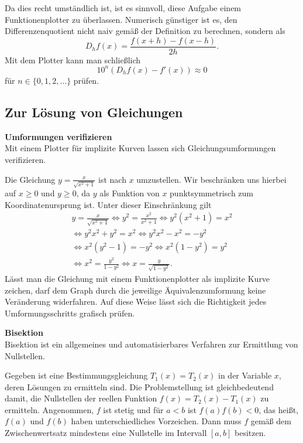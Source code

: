 \documentclass[paper=180mm:225mm,pagesize=auto,fleqn,twoside,11pt,dvipdfmx]{scrartcl}
\theoremstyle{rmbox}
\newenvironment{Rezept}[1]{\strong{#1}\\}{}
\newcommand{\strong}[1]{\textsf{\textbf{#1}}}
\begin{document}
Da dies recht umständlich ist, ist es sinnvoll, diese Aufgabe einem
Funktionenplotter zu überlassen. Numerisch günstiger ist es, den
Differenzenquotient nicht naiv gemäß der Definition zu berechnen,
sondern als%
\[D_h f(x) = \frac{f(x+h)-f(x-h)}{2h}.\]
Mit dem Plotter kann man schließlich
\[10^n (D_h f(x) - f'(x)) \approx 0\]
für $n\in\{0,1,2,\ldots\}$ prüfen.

\subsection{Zur Lösung von Gleichungen}

\begin{Rezept}{Umformungen verifizieren}
Mit einem Plotter für implizite Kurven lassen sich
Gleichungsumformungen verifizieren.
\end{Rezept}

\noindent
Die Gleichung $y = \tfrac{x}{\sqrt{x^2+1}}$ ist nach $x$ umzustellen.
Wir beschränken uns hierbei auf $x\ge 0$ und $y\ge 0$, da $y$
als Funktion von $x$ punktsymmetrisch zum Koordinatenursprung ist.
Unter dieser Einschränkung gilt
\begin{gather*}
y = \tfrac{x}{\sqrt{x^2+1}}\iff y^2 = \tfrac{x^2}{x^2+1}
\iff y^2(x^2+1) = x^2\\
\iff y^2 x^2 + y^2 = x^2
\iff y^2 x^2 - x^2 = -y^2\\
\iff x^2 (y^2 - 1) = -y^2
\iff x^2 (1 - y^2) = y^2\\
\iff x^2 = \tfrac{y^2}{1-y^2}
\iff x = \tfrac{y}{\sqrt{1-y^2}}.
\end{gather*}
Lässt man die Gleichung mit einem Funktionenplotter als implizite Kurve
zeichen, darf dem Graph durch die jeweilige Äquivalenzumformung keine
Veränderung widerfahren. Auf diese Weise lässt sich die Richtigkeit
jedes Umformungsschritts grafisch prüfen.

\begin{Rezept}{Bisektion}
Bisektion ist ein allgemeines und automatisierbares
Verfahren zur Ermittlung von Nullstellen.
\end{Rezept}

\noindent
Gegeben ist eine Bestimmungsgleichung $T_1(x)=T_2(x)$ in der
Variable $x$, deren Lösungen zu ermitteln sind. Die Problemstellung
ist gleichbedeutend damit, die Nullstellen der reellen Funktion
$f(x)=T_2(x)-T_1(x)$ zu ermitteln. Angenommen, $f$ ist stetig
und für $a<b$ ist $f(a)f(b)<0$, das heißt, $f(a)$ und $f(b)$ haben
unterschiedliches Vorzeichen. Dann muss $f$ gemäß dem Zwischenwertsatz
mindestens eine Nullstelle im Intervall $[a,b]$ besitzen.
\end{document}
